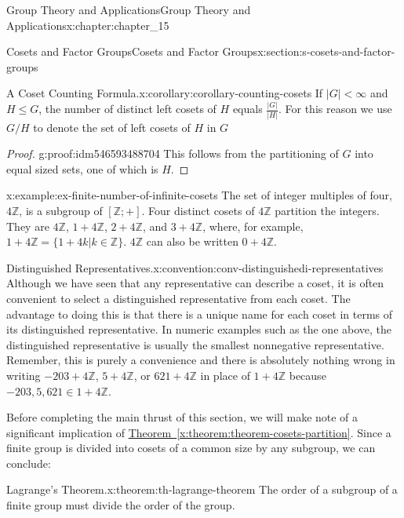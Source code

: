 \documentclass[oneside,10pt,]{book}
\newcommand{\xreffont}{\relax}
\numberwithin{equation}{section}
\begin{document}
\begin{chapterptx}{Group Theory and Applications}{}{Group Theory and Applications}{}{}{x:chapter:chapter_15}
\begin{sectionptx}{Cosets and Factor Groups}{}{Cosets and Factor Groups}{}{}{x:section:s-cosets-and-factor-groups}
\begin{corollary}{A Coset Counting Formula.}{}{x:corollary:corollary-counting-cosets}%
%
If \(\lvert G\rvert < \infty\) and \(H\leq G\), the number of distinct left cosets of \(H\) equals \(\frac{\lvert
G\rvert }{\lvert H\rvert }\). For this reason we use \(G/H\) to denote the set of left cosets of \(H\) in \(G\)%
\end{corollary}
\begin{proof}{}{g:proof:idm546593488704}
This follows from the partitioning of \(G\) into equal sized sets, one of which is \(H\).%
\end{proof}
\begin{example}{}{x:example:ex-finite-number-of-infinite-cosets}%
The set of integer multiples of four, \(4\mathbb{Z}\), is a subgroup of \([\mathbb{Z}; +]\). Four distinct cosets of \(4\mathbb{Z}\) partition the integers. They are \(4\mathbb{Z}\), \(1+4\mathbb{Z}\), \(2+4\mathbb{Z}\), and \(3+4\mathbb{Z}\), where, for example, \(1+4\mathbb{Z}
= \{1+4k | k \in  \mathbb{Z}\}\).   \(4\mathbb{Z}\) can also be written \(0+4\mathbb{Z}\).%
\end{example}
\begin{convention}{Distinguished Representatives.}{x:convention:conv-distinguishedi-representatives}%
Although we have seen that any representative can describe a coset, it is often convenient to select a distinguished representative from each coset. The advantage to doing this is that there is a unique name for each coset in terms of its distinguished representative. In numeric examples such as the one above, the distinguished representative is usually the smallest nonnegative representative. Remember, this is purely a convenience and there is absolutely nothing wrong in writing \(-203+4\mathbb{Z}\), \(5+4\mathbb{Z}\), or \(621+4\mathbb{Z}\) in place of \(1+4\mathbb{Z}\)  because  \(-203, 5, 621 \in 1+4\mathbb{Z}\).%
\end{convention}
Before completing the main thrust of this section, we will make note of a significant implication of \hyperref[x:theorem:theorem-cosets-partition]{Theorem~{\xreffont\ref{x:theorem:theorem-cosets-partition}}}. Since a finite group is divided into cosets of a common size by any subgroup, we can conclude:%
\begin{theorem}{Lagrange's Theorem.}{}{x:theorem:th-lagrange-theorem}%
%
The order of a subgroup of a finite group must divide the order of the group.%
\end{theorem}

\end{sectionptx}
\end{chapterptx}
\end{document}
